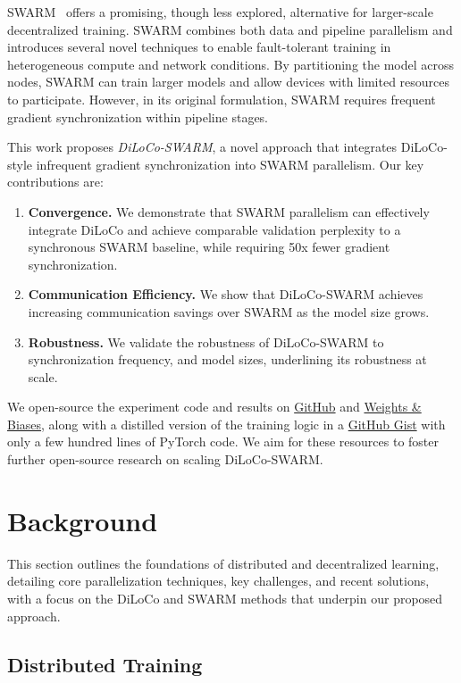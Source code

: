 \documentclass{article}
\newcommand{\github}{\href{https://github.com/mikasenghaas/diloco-swarm}{GitHub}}
\newcommand{\wandb}{\href{https://wandb.ai/mikasenghaas/diloco-swarm}{Weights \& Biases}}
\newcommand{\gist}{\href{https://gist.github.com/mikasenghaas/5fa1aa77ea69f187f531a5889983c249}{GitHub Gist}}
\begin{document}
SWARM~\cite{ryabinin2023swarm} offers a promising, though less explored, alternative for larger-scale decentralized training. SWARM combines both data and pipeline parallelism and introduces several novel techniques to enable fault-tolerant training in heterogeneous compute and network conditions. By partitioning the model across nodes, SWARM can train larger models and allow devices with limited resources to participate. However, in its original formulation, SWARM requires frequent gradient synchronization within pipeline stages. 

This work proposes \textit{DiLoCo-SWARM}, a novel approach that integrates DiLoCo-style infrequent gradient synchronization into SWARM parallelism. Our key contributions are:

\begin{enumerate}
  \item \textbf{Convergence.} We demonstrate that SWARM parallelism can effectively integrate DiLoCo and achieve comparable validation perplexity to a synchronous SWARM baseline, while requiring 50x fewer gradient synchronization.
  \item \textbf{Communication Efficiency.} We show that DiLoCo-SWARM achieves increasing communication savings over SWARM as the model size grows.
  \item \textbf{Robustness.} We validate the robustness of DiLoCo-SWARM to synchronization frequency, and model sizes, underlining its robustness at scale.
\end{enumerate}

We open-source the experiment code and results on \github{} and \wandb{}, along with a distilled version of the training logic in a \gist{} with only a few hundred lines of PyTorch code. We aim for these resources to foster further open-source research on scaling DiLoCo-SWARM.

\section{Background}

This section outlines the foundations of distributed and decentralized learning, detailing core parallelization techniques, key challenges, and recent solutions, with a focus on the DiLoCo and SWARM methods that underpin our proposed approach.

\subsection{Distributed Training}
\end{document}
